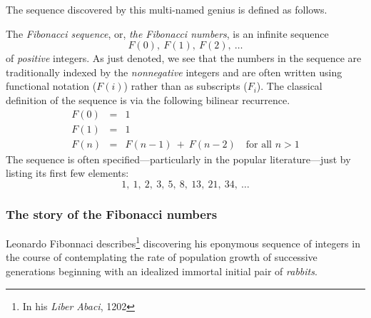 \medskip

\noindent
The sequence discovered by this multi-named genius is defined as follows.

\medskip

The {\it Fibonacci sequence}, or, {\it the Fibonacci numbers}, is an infinite sequence
\[ F(0), \ F(1), \ F(2), \ \ldots \]
of {\em positive} integers.  As just denoted, we see that the numbers in the sequence are traditionally indexed by the {\em nonnegative} integers and are often written using functional notation ($F(i)$) rather than as subscripts ($F_i$).  The classical definition of the sequence is via the following bilinear recurrence.
\begin{eqnarray}
\nonumber
F(0) & = & 1 \\
\label{eq:Fibonacci-defn}
F(1) & = & 1 \\
\nonumber
F(n) & = & F(n-1) \ + \ F(n-2) \ \ \ \mbox{ for all } n > 1
\end{eqnarray}
The sequence is often specified---particularly in the popular literature---just by listing its first few elements:
\[ 1, \ 1, \ 2, \ 3, \ 5, \ 8, \ 13, \ 21, \ 34, \ \ldots \]


\subsubsection{The story of the Fibonacci numbers}
\label{sec:Fibonacci-story}

Leonardo Fibonnaci describes\footnote{In his {\it Liber Abaci}, 1202} discovering his eponymous sequence of integers in the course of contemplating the rate of population growth of successive generations beginning with an idealized immortal initial pair of {\it rabbits}.

\smallskip

